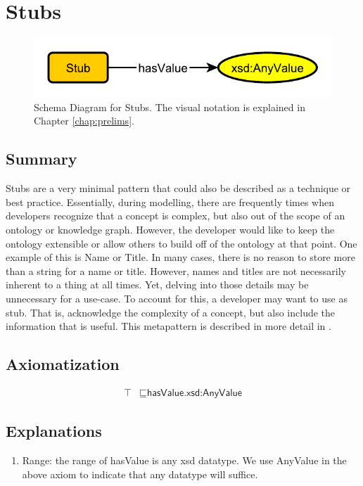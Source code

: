 \section{Stubs}
\label{sec:Stubs}
\begin{figure}[h!]
\begin{center}
\includegraphics[width=.4\textwidth]{figures/stubs}
\end{center}
\caption{Schema Diagram for Stubs. The visual notation is explained in Chapter \ref{chap:prelims}.}
\label{fig:Stubs}
\end{figure}
\subsection{Summary}
\label{sum:Stubs}
Stubs are a very minimal pattern that could also be described as a technique or best practice. Essentially, during modelling, there are frequently times when developers recognize that a concept is complex, but also out of the scope of an ontology or knowledge graph. However, the developer would like to keep the ontology extensible or allow others to build off of the ontology at that point. One example of this is Name or Title. In many cases, there is no reason to store more than a string for a name or title. However, names and titles are not necessarily inherent to a thing at all times. Yet, delving into those details may be unnecessary for a use-case. To account for this, a developer may want to use as stub. That is, acknowledge the complexity of a concept, but also include the information that is useful. This metapattern is described in more detail in \cite{stub}. 

\subsection{Axiomatization}
\label{axs:Stubs}
\begin{align}
\top &\sqsubseteq \textsf{hasValue.xsd:AnyValue}
\end{align}

\subsection{Explanations}
\label{exp:Stubs}
\begin{enumerate}
\item Range: the range of \textsf{hasValue} is any xsd datatype. We use AnyValue in the above axiom to indicate that any datatype will suffice.
\end{enumerate}

